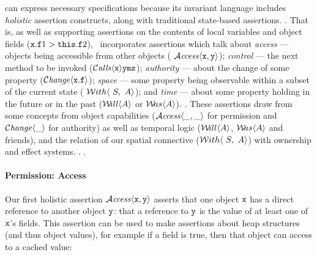 \Chainmail can express necessary specifications because its invariant
language includes  \textit{holistic}
assertion constructs, along with traditional state-based assertions.
{}.
That is, as well as supporting assertions on the contents of local
variables and object fields (\eg ${\mbox{\tt{x}}}.{\mbox{\tt{f}}}1 > {\mbox{\tt{this}}}.{\mbox{\tt{f}}}2$),
\Chainmail\ incorporates assertions which talk about
%
\textit{access}
--- objects being accessible from other objects (\eg
${\mathcal{A}}\textrm{\textit{ccess}}\langle {\mbox{\tt{x}}},{\mbox{\tt{y}}}\rangle$);
%
\textit{control} --- the
next method to be invoked (${\mathcal{C}}\textrm{\textit{alls}}\langle {\mbox{\tt{x}}}\rangle {{\mbox{\tt{y}}}} {{\mbox{\tt{m}}}} {{{\mbox{\tt{z}}}}}$);
%
\textit{authority} --- about the change of some
property (\eg $\mathcal{C}\textrm{\textit{hange}}\langle{\mbox{\tt{x}}}.{\mbox{\tt{f}}}\rangle$);
%
\textit{space} --- some property being observable within a subset of
the current state ( ${\mathcal W}ith\langle\ S,\ A\rangle$);
%
and
%
\textit{time} --- about some property
holding in the future or in the past (\eg ${{\mathcal W}\!ill}\langle A\rangle$ or ${{\mathcal W}\!as}\langle A\rangle$).
%
.
%
%
These assertions draw from some concepts from object capabilities
(${\mathcal{A}}\textrm{\textit{ccess}}\langle \_,\_\rangle$  for  permission and $\mathcal{C}\textrm{\textit{hange}}\langle\_\rangle$ for
authority) 
as well as temporal logic (${{\mathcal W}\!ill}\langle A\rangle$, ${{\mathcal W}\!as}\langle A\rangle$ and friends), and the relation of
our spatial connective (${\mathcal W}ith\langle\ S,\ A\rangle$)  with ownership and effect
systems.
{}. 
{}  
%
{}.

\paragraph{Permission: Access}

Our first holistic assertion ${\mathcal{A}}\textrm{\textit{ccess}}\langle {\mbox{\tt{x}}},{\mbox{\tt{y}}}\rangle$ asserts that one
object ${\mbox{\tt{x}}}$ has a direct reference to another object ${\mbox{\tt{y}}}$: that a
reference to ${\mbox{\tt{y}}}$ is the value of at least one of ${\mbox{\tt{x}}}$'s fields.
This assertion can be used to make assertions about heap structures (and thus
object values), for example if a  field is true,
then that object can access to a cached value:

